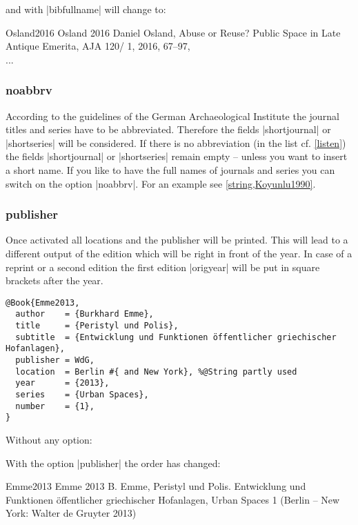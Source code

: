 \documentclass[a4paper,
10pt,
greek,
french,
spanish,
italian,
ngerman,
english
]{ltxdoc}
\begin{document}
and with |bibfullname| will change to:

\begin{bibbsp}{Osland2016}
Osland 2016\hspace{3em} {\color{red}Daniel} Osland, Abuse or Reuse? Public Space in Late Antique Emerita, AJA 120/ 1, 2016, 67–97,\\
...
\end{bibbsp}


\subsubsection{noabbrv}\label{noabbrevs}
According to the guidelines of the German Archaeological Institute the journal titles and series have to be abbreviated.
Therefore the fields |shortjournal| or |shortseries| will be considered. 
If there is no abbreviation (in the list cf. \cref{listen}) the fields |shortjournal| or |shortseries| remain empty -- unless you want to insert a short name.  
If you like to have the full names of journals and series you can switch on the option |noabbrv|.
For an example see \cref{string,Koyunlu1990}.

\subsubsection{publisher}\label{publisher}
Once activated all locations and the publisher will be printed. This will lead to a different output of the edition which will be right in front of the year.
In case of a reprint or a second edition the first edition |origyear| will be put in square brackets after the year.

\begin{lstlisting}[style=bibentry,label=Emme2013,caption={{@}Book\{Emme2013,…\} }]
@Book{Emme2013,
  author    = {Burkhard Emme},
  title     = {Peristyl und Polis},
  subtitle  = {Entwicklung und Funktionen öffentlicher griechischer Hofanlagen},
  publisher = WdG,
  location  = Berlin #{ and New York}, %@String partly used
  year      = {2013},
  series    = {Urban Spaces},
  number    = {1},
}
\end{lstlisting}

\begin{refsection}\end{refsection}%
Without any option:

 
With the option |publisher| the order has changed:
 \begin{bibbsp}{Emme2013}
Emme 2013\hspace{3em} B. Emme, Peristyl und Polis. Entwicklung und Funktionen öffentlicher griechischer Hofanlagen, Urban Spaces 1 (Berlin {\color{red} – New York: Walter de Gruyter} 2013)
 \end{bibbsp}
 
\end{document}
